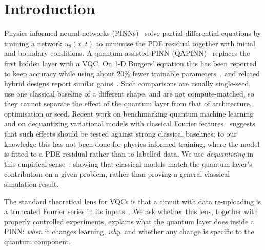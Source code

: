 \documentclass[11pt]{article}
\begin{document}
\section{Introduction}
Physics-informed neural networks (PINNs)~\cite{raissi} solve partial differential
equations by training a network $u_\theta(x,t)$ to minimise the PDE residual together
with initial and boundary conditions. A quantum-assisted PINN (QAPINN)~\cite{qapinn}
replaces the first hidden layer with a VQC. On 1-D Burgers' equation this has been
reported to keep accuracy while using about 20\% fewer trainable
parameters~\cite{qapinn}, and related hybrid designs report similar
gains~\cite{qcpinn}. Such comparisons are usually single-seed, use one classical
baseline of a different shape, and are not compute-matched, so they cannot separate
the effect of the quantum layer from that of architecture, optimisation or seed.
Recent work on benchmarking quantum machine learning~\cite{bowles} and on dequantizing
variational models with classical Fourier features~\cite{landman,sweke,sahebi} suggests
that such effects should be tested against strong classical baselines; to our knowledge
this has not been done for physics-informed training, where the model is fitted to a PDE
residual rather than to labelled data. We use \emph{dequantizing} in this empirical
sense~\cite{landman,sweke}: showing that classical models match the quantum layer's
contribution on a given problem, rather than proving a general classical simulation
result.

The standard theoretical lens for VQCs is that a circuit with data re-uploading is a
truncated Fourier series in its inputs~\cite{schuld,reupload}. We ask whether this
lens, together with properly controlled experiments, explains what the quantum layer
does inside a PINN: \emph{when} it changes learning, \emph{why}, and whether any
change is specific to the quantum component.
\end{document}
